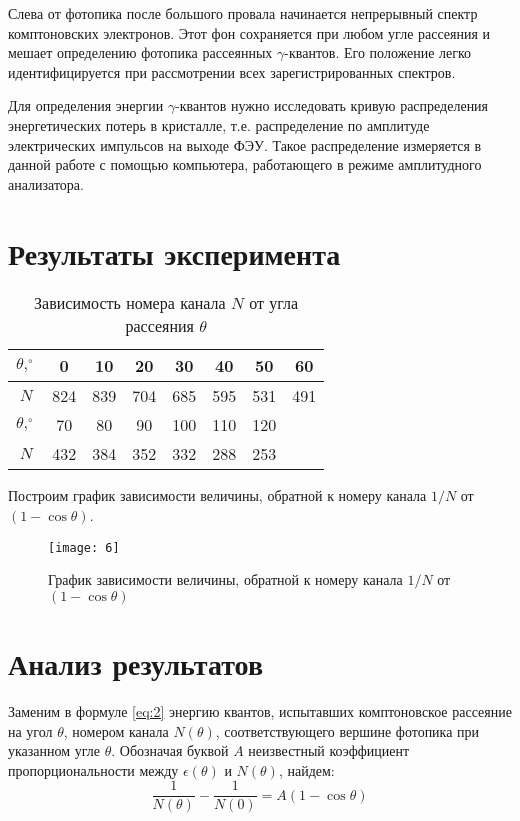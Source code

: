 \documentclass[a4paper, 12pt]{article}
\begin{document}
Слева от фотопика после большого провала начинается непрерывный спектр
комптоновских электронов. Этот фон сохраняется при любом угле
рассеяния и мешает определению фотопика рассеянных $\gamma$-квантов.
Его положение легко идентифицируется при рассмотрении всех
зарегистрированных спектров.

Для определения энергии $\gamma$-квантов нужно исследовать кривую
распределения энергетических потерь в кристалле, т.е. распределение по
амплитуде электрических импульсов на выходе ФЭУ. Такое распределение
измеряется в данной работе с помощью компьютера, работающего в режиме
амплитудного анализатора.










\section{Результаты эксперимента}


\renewcommand{\arraystretch}{1.5}
\begin{table}[H]
\centering
\begin{tabular}{|c|c|c|c|c|c|c|c}
\hline 
$\theta, ^{\circ}$ & 0   & 10  & 20  & 30  & 40  & 50  & \multicolumn{1}{c|}{60}  \\ \hline
$N$ & 824 & 839 & 704 & 685 & 595 & 531 & \multicolumn{1}{c|}{491} \\
\hline \hline 
$\theta, ^{\circ}$ & 70  & 80  & 90  & 100 & 110 & 120 & \multirow{2}{*}{}        \\ \cline{1-7}
$N$ & 432 & 384 & 352 & 332 & 288 & 253 &                          \\ \cline{1-7}
\end{tabular}
\caption{Зависимость номера канала $N$ от угла рассеяния $\theta$}
\end{table}


Построим график зависимости величины, обратной к номеру канала $1/N$
от $(1-\cos \theta)$. 


\begin{figure}[H]
    \texttt{[image: 6]} 
    \caption{График зависимости величины, обратной к номеру канала $1/N$
от $(1-\cos \theta)$}
\label{fig:6}
\end{figure}







\section{Анализ результатов}
Заменим в формуле \eqref{eq:2} энергию квантов, испытавших
комптоновское рассеяние на угол $\theta$, номером канала $N(\theta)$,
соответствующего вершине фотопика при указанном угле $\theta$.
Обозначая буквой $A$ неизвестный коэффициент пропорциональности между
$\epsilon (\theta)$ и $N (\theta)$, найдем:
\begin{equation}
    \frac{1}{N (\theta)} - \frac{1}{N(0)} = A (1 - \cos \theta)
    \label{eq:3}
\end{equation}
\end{document}
